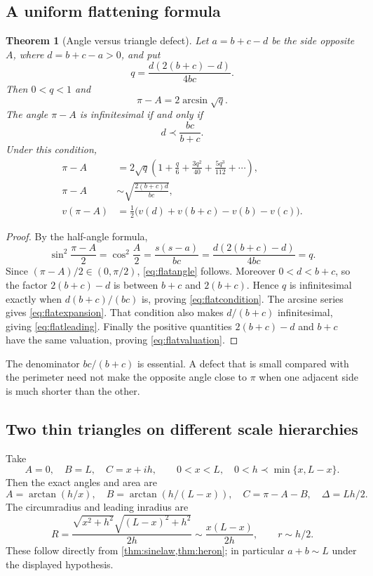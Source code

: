 \documentclass[11pt,letterpaper]{article}
\newtheorem{theorem}{Theorem}[section]
\theoremstyle{definition}
\theoremstyle{remark}
\newcommand{\arcs}{\operatorname{arcsin}}
\newcommand{\arct}{\operatorname{arctan}}
\numberwithin{equation}{section}
\begin{document}
\subsection{A uniform flattening formula}
\begin{theorem}[Angle versus triangle defect]\label{thm:flat}
Let $a=b+c-d$ be the side opposite $A$, where $d=b+c-a>0$, and put
\[
 q=\frac{d(2(b+c)-d)}{4bc}.
\]
Then $0<q<1$ and
\begin{equation}\label{eq:flatangle}
 \pi-A=2\arcs\sqrt q.
\end{equation}
The angle $\pi-A$ is infinitesimal if and only if
\begin{equation}\label{eq:flatcondition}
 d\prec\frac{bc}{b+c}.
\end{equation}
Under this condition,
\begin{align}
 \pi-A&=2\sqrt q\left(1+\frac q6+\frac{3q^2}{40}
                           +\frac{5q^3}{112}+\cdots\right),\label{eq:flatexpansion}\\
 \pi-A&\sim\sqrt{\frac{2(b+c)d}{bc}},\label{eq:flatleading}\\
 v(\pi-A)&=\frac12\bigl(v(d)+v(b+c)-v(b)-v(c)\bigr).
 \label{eq:flatvaluation}
\end{align}
\end{theorem}
\begin{proof}
By the half-angle formula,
\[
 \sin^2\frac{\pi-A}{2}=\cos^2\frac A2
 =\frac{s(s-a)}{bc}
 =\frac{d(2(b+c)-d)}{4bc}=q.
\]
Since $(\pi-A)/2\in(0,\pi/2)$, \eqref{eq:flatangle} follows. Moreover $0<d<b+c$, so the factor $2(b+c)-d$ is between $b+c$ and $2(b+c)$. Hence $q$ is infinitesimal exactly when $d(b+c)/(bc)$ is, proving \eqref{eq:flatcondition}. The arcsine series gives \eqref{eq:flatexpansion}. That condition also makes $d/(b+c)$ infinitesimal, giving \eqref{eq:flatleading}. Finally the positive quantities $2(b+c)-d$ and $b+c$ have the same valuation, proving \eqref{eq:flatvaluation}.
\end{proof}
The denominator $bc/(b+c)$ is essential. A defect that is small compared with the perimeter need not make the opposite angle close to $\pi$ when one adjacent side is much shorter than the other.

\subsection{Two thin triangles on different scale hierarchies}
Take
\[
 A=0,\quad B=L,\quad C=x+ih,
 \qquad 0<x<L,\quad 0<h\prec\min\{x,L-x\}.
\]
Then the exact angles and area are
\begin{equation}\label{eq:thintriangle}
 A=\arct(h/x),\quad B=\arct(h/(L-x)),\quad
 C=\pi-A-B,\quad \Delta=Lh/2.
\end{equation}
The circumradius and leading inradius are
\[
 R=\frac{\sqrt{x^2+h^2}\sqrt{(L-x)^2+h^2}}{2h}
       \sim\frac{x(L-x)}{2h},\qquad r\sim h/2.
\]
These follow directly from \cref{thm:sinelaw,thm:heron}; in particular $a+b\sim L$ under the displayed hypothesis.
\end{document}
